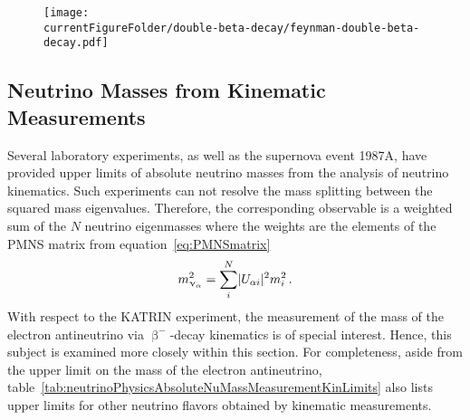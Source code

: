 \begin{figure}[t]
	\centering
	\texttt{[image: \\currentFigureFolder/double-beta-decay/feynman-double-beta-decay.pdf]}
	\label{fig:neutrinoPhysicsAbsoluteNuMassMeasurementDoubleBeta}
\end{figure}

\subsection{Neutrino Masses from Kinematic Measurements}
\label{sec:neutrinoPhysicsAbsoluteNuMassMeasurementKinematics}
Several laboratory experiments, as well as the
supernova event 1987A, have provided upper limits of absolute neutrino masses from the analysis of neutrino kinematics. Such experiments can not resolve the mass splitting between the squared mass eigenvalues. Therefore, the corresponding observable is a weighted sum of the $N$ neutrino eigenmasses where the weights are the elements of the PMNS matrix from equation~\eqref{eq:PMNSmatrix}~\cite{Otten:2008zz}
\begin{equation}
\label{eq:nuMassSquared}
    m^2_{\upnu_{\alpha}} = \sum_{i}^{N}\lvert U_{\alpha i}\rvert^2 m_i^2 \text{\,.}
\end{equation}
With respect to the KATRIN experiment, the measurement of the mass of the electron antineutrino via $\upbeta^-$-decay kinematics is of special interest. Hence, this subject is examined more closely within this section. For completeness, aside from the upper limit on the mass of the electron antineutrino, table~\ref{tab:neutrinoPhysicsAbsoluteNuMassMeasurementKinLimits} also lists upper limits for other neutrino flavors obtained by kinematic measurements.
